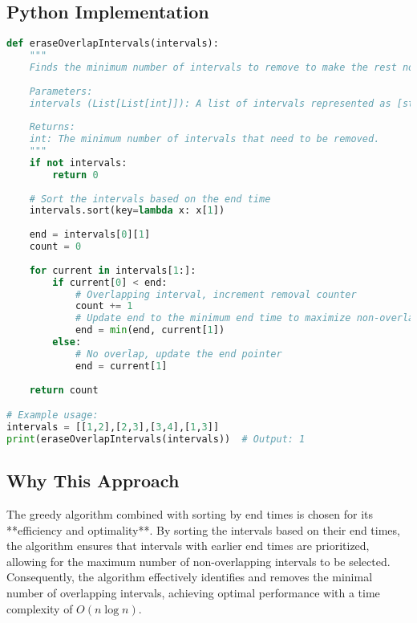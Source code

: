 \subsection*{Python Implementation}
\begin{fullwidth}
\begin{lstlisting}[language=Python]
def eraseOverlapIntervals(intervals):
    """
    Finds the minimum number of intervals to remove to make the rest non-overlapping.
    
    Parameters:
    intervals (List[List[int]]): A list of intervals represented as [start, end].
    
    Returns:
    int: The minimum number of intervals that need to be removed.
    """
    if not intervals:
        return 0
    
    # Sort the intervals based on the end time
    intervals.sort(key=lambda x: x[1])
    
    end = intervals[0][1]
    count = 0
    
    for current in intervals[1:]:
        if current[0] < end:
            # Overlapping interval, increment removal counter
            count += 1
            # Update end to the minimum end time to maximize non-overlapping intervals
            end = min(end, current[1])
        else:
            # No overlap, update the end pointer
            end = current[1]
    
    return count

# Example usage:
intervals = [[1,2],[2,3],[3,4],[1,3]]
print(eraseOverlapIntervals(intervals))  # Output: 1
\end{lstlisting}
\end{fullwidth}

\subsection*{Why This Approach}
The greedy algorithm combined with sorting by end times is chosen for its **efficiency and optimality**. By sorting the intervals based on their end times, the algorithm ensures that intervals with earlier end times are prioritized, allowing for the maximum number of non-overlapping intervals to be selected. Consequently, the algorithm effectively identifies and removes the minimal number of overlapping intervals, achieving optimal performance with a time complexity of \( O(n \log n) \).

